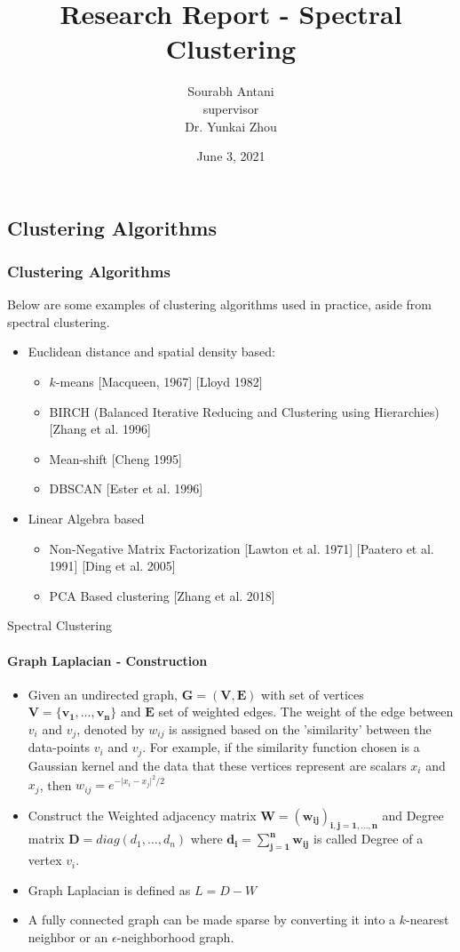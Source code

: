 \documentclass[10pt,a4paper, nocenter]{beamer}
\author[S. Antani (supervisor Dr. Zhou)]{Sourabh Antani \\ supervisor \\ Dr. Yunkai Zhou}
\title[Spectral Clustering]{Research Report - Spectral Clustering}
\date{June 3, 2021}
\institute[SMU - MATH]{Mathematics Department,\\Southern Methodist University}
\begin{document}
	\begin{frame}
		\titlepage
	\end{frame}
    
    \begin{frame}
    \section{Clustering Algorithms}
    \frametitle{Clustering Algorithms}
    Below are some examples of clustering algorithms used in practice, aside from spectral clustering. 
    \begin{itemize}
        \item <1-> Euclidean distance and spatial density based:
	    \begin{itemize}
    	    \item <2-> $k$-means [Macqueen, 1967] [Lloyd 1982]
            \item <3-> BIRCH (Balanced Iterative Reducing and Clustering using Hierarchies) [Zhang et al. 1996]
            \item <4-> Mean-shift [Cheng 1995]
            \item <5-> DBSCAN [Ester et al. 1996]
		\end{itemize}
        \item <6-> Linear Algebra based
	    \begin{itemize}
	    	\item <7-> Non-Negative Matrix Factorization [Lawton et al. 1971] [Paatero et al. 1991] [Ding et al. 2005]
            \item <8-> PCA Based clustering [Zhang et al. 2018]
        \end{itemize}
    \end{itemize}
    \end{frame}

	
	\begin{frame}{Spectral Clustering}
		\framesubtitle{Graph Laplacian - Construction}
		
		\begin{itemize}
			\item<1-> Given an undirected graph, $\mathbf{G=(V,E)}$ with set of vertices $\mathbf{V=\{v_{1},\dots,v_{n}\}}$ and $\mathbf{E}$ set of weighted edges. The weight of the edge between $v_i$ and $v_j$, denoted by $w_{ij}$ is assigned based on the 'similarity' between the data-points $v_i$ and $v_j$. For example, if the similarity function chosen is a Gaussian kernel and the data that these vertices represent are scalars $x_i$ and $x_j$, then $w_{ij} = e^{-\lvert x_i - x_j \rvert^2/2}$
			\item<2-> Construct the Weighted adjacency matrix $\mathbf{W=(w_{ij})_{i,j=1,\dots,n}}$ and Degree matrix $\mathbf{D} = diag(d_{1} ,\dots, d_{n})$ where $\mathbf{d_{i} = \sum_{j=1}^{n}w_{ij}}$ is called Degree of a vertex $v_i$.
			\item<3-> Graph Laplacian is defined as $L = D - W$
			\item<4-> A fully connected graph can be made sparse by converting it into a $k$-nearest neighbor or an $\epsilon$-neighborhood graph.
		\end{itemize}
	\end{frame}
\end{document}
